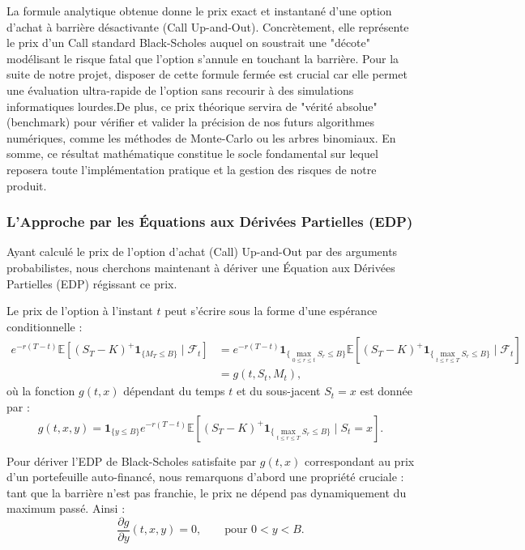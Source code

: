 \documentclass[11pt]{article}
\begin{document}
La formule analytique obtenue donne le prix exact et instantané d'une option d'achat à barrière désactivante (Call Up-and-Out). Concrètement, elle représente le prix d'un Call standard Black-Scholes auquel on soustrait une "décote" modélisant le risque fatal que l'option s'annule en touchant la barrière. Pour la suite de notre projet, disposer de cette formule fermée est crucial car elle permet une évaluation ultra-rapide de l'option sans recourir à des simulations informatiques lourdes.De plus, ce prix théorique servira de "vérité absolue" (benchmark) pour vérifier et valider la précision de nos futurs algorithmes numériques, comme les méthodes de Monte-Carlo ou les arbres binomiaux. En somme, ce résultat mathématique constitue le socle fondamental sur lequel reposera toute l'implémentation pratique et la gestion des risques de notre produit.

\subsubsection{L'Approche par les Équations aux Dérivées Partielles (EDP)}

Ayant calculé le prix de l'option d'achat (Call) Up-and-Out par des arguments probabilistes, nous cherchons maintenant à dériver une Équation aux Dérivées Partielles (EDP) régissant ce prix.

Le prix de l'option à l'instant $t$ peut s'écrire sous la forme d'une espérance conditionnelle :
\begin{align*}
e^{-r(T-t)} \mathbb{E} \left[ (S_T - K)^+ \mathbf{1}_{\{M_T \le B\}} \mid \mathcal{F}_t \right] &= e^{-r(T-t)} \mathbf{1}_{\{ \max_{0 \le r \le t} S_r \le B \}} \mathbb{E} \left[ (S_T - K)^+ \mathbf{1}_{\{ \max_{t \le r \le T} S_r \le B \}} \mid \mathcal{F}_t \right] \\
&= g(t, S_t, M_t),
\end{align*}
où la fonction $g(t, x)$ dépendant du temps $t$ et du sous-jacent $S_t = x$ est donnée par :
\begin{equation}
g(t, x, y) = \mathbf{1}_{\{y \le B\}} e^{-r(T-t)} \mathbb{E} \left[ (S_T - K)^+ \mathbf{1}_{\{ \max_{t \le r \le T} S_r \le B \}} \mid S_t = x \right].
\end{equation}

Pour dériver l'EDP de Black-Scholes satisfaite par $g(t, x)$ correspondant au prix d'un portefeuille auto-financé, nous remarquons d'abord une propriété cruciale : tant que la barrière n'est pas franchie, le prix ne dépend pas dynamiquement du maximum passé. Ainsi :
\begin{equation}
\frac{\partial g}{\partial y}(t, x, y) = 0, \qquad \text{pour } 0 < y < B.
\end{equation}
\end{document}
